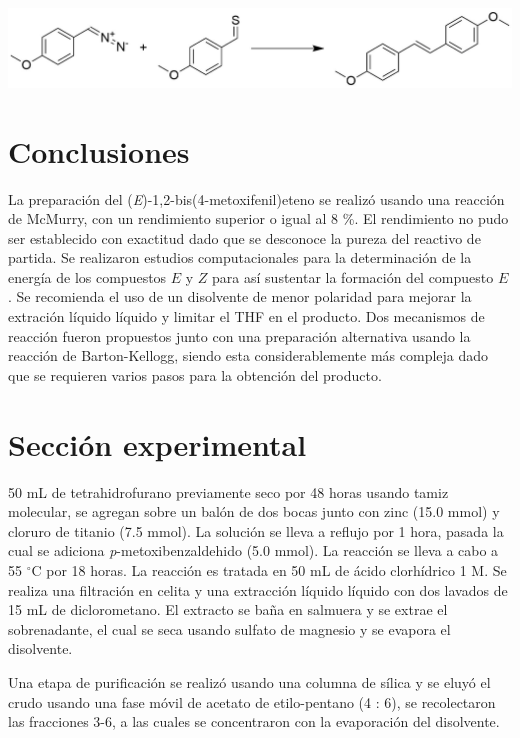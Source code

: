 \documentclass[fleqn,11pt]{SelfArx}
\begin{document}
\begin{scheme}[h]
	\centering
	\includegraphics[width=\linewidth]{structures/Barton.png}
	\caption{Obtenci\'on del (\textit{E})-1,2-bis(4-metoxifenil)eteno usando la reacci\'on de Barton-Kellogg.}
\end{scheme}

\section{Conclusiones}
La preparaci\'on del (\textit{E})-1,2-bis(4-metoxifenil)eteno se realiz\'o usando una reacci\'on de McMurry, con un rendimiento superior o igual al 8 \%. El rendimiento no pudo ser establecido con exactitud dado que se desconoce la pureza del reactivo de partida. Se realizaron estudios computacionales para la determinaci\'on de la energ\'ia de los compuestos $E$ y $Z$ para as\'i sustentar la formaci\'on del compuesto $E$. Se recomienda el uso de un disolvente de menor polaridad para mejorar la extraci\'on l\'iquido l\'iquido y limitar el THF en el producto. Dos mecanismos de reacci\'on fueron propuestos junto con una preparaci\'on alternativa usando la reacci\'on de Barton-Kellogg, siendo esta considerablemente m\'as compleja dado que se requieren varios pasos para la obtenci\'on del producto.

\section{Secci\'on experimental}
50 mL de tetrahidrofurano previamente seco por 48 horas usando tamiz molecular, se agregan sobre un bal\'on de dos bocas junto con zinc (15.0 mmol) y cloruro de titanio (7.5 mmol). La soluci\'on se lleva a reflujo por 1 hora, pasada la cual se adiciona \textit{p}-metoxibenzaldehido (5.0 mmol). La reacci\'on se lleva a cabo a 55 $^\circ$C por 18 horas. La reacci\'on es tratada en 50 mL de \'acido clorh\'idrico 1 M. Se realiza una filtraci\'on en celita y una extracci\'on l\'iquido l\'iquido con dos lavados de 15 mL de diclorometano. El extracto se baña en salmuera y se extrae el sobrenadante, el cual se seca usando sulfato de magnesio y se evapora el disolvente.

Una etapa de purificaci\'on se realizó usando una columna de s\'ilica y se eluy\'o el crudo usando una fase m\'ovil de acetato de etilo-pentano (4 : 6), se recolectaron las fracciones 3-6, a las cuales se concentraron con la evaporaci\'on del disolvente.
\end{document}
